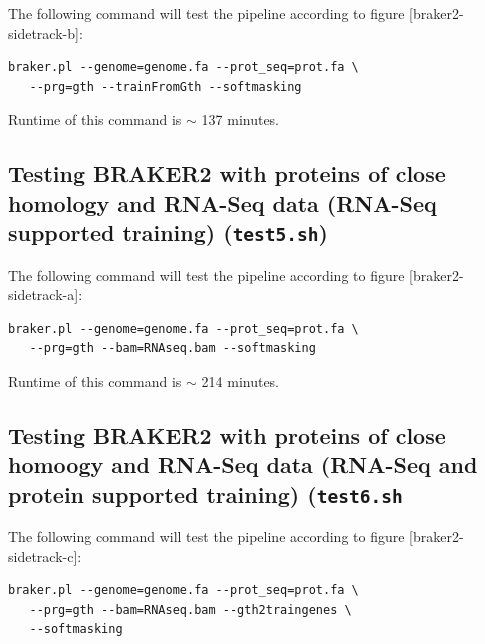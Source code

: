 \documentclass[]{article}
\begin{document}
The following command will test the pipeline according to figure
{[}braker2-sidetrack-b{]}:

\begin{verbatim}
braker.pl --genome=genome.fa --prot_seq=prot.fa \
   --prg=gth --trainFromGth --softmasking
\end{verbatim}

Runtime of this command is \(\sim\) 137 minutes.

\hypertarget{testing-braker2-with-proteins-of-close-homology-and-rna-seq-data-rna-seq-supported-training-test5.sh}{\subsection{\texorpdfstring{Testing
BRAKER2 with proteins of close homology and RNA-Seq data (RNA-Seq
supported training)
(\texttt{test5.sh})}{Testing BRAKER2 with proteins of close homology and RNA-Seq data (RNA-Seq supported training) (test5.sh)}}\label{testing-braker2-with-proteins-of-close-homology-and-rna-seq-data-rna-seq-supported-training-test5.sh}}

The following command will test the pipeline according to figure
{[}braker2-sidetrack-a{]}:

\begin{verbatim}
braker.pl --genome=genome.fa --prot_seq=prot.fa \
   --prg=gth --bam=RNAseq.bam --softmasking
\end{verbatim}

Runtime of this command is \(\sim\) 214 minutes.

\hypertarget{testing-braker2-with-proteins-of-close-homoogy-and-rna-seq-data-rna-seq-and-protein-supported-training-test6.sh}{\subsection{\texorpdfstring{Testing
BRAKER2 with proteins of close homoogy and RNA-Seq data (RNA-Seq and
protein supported training)
(\texttt{test6.sh}}{Testing BRAKER2 with proteins of close homoogy and RNA-Seq data (RNA-Seq and protein supported training) (test6.sh}}\label{testing-braker2-with-proteins-of-close-homoogy-and-rna-seq-data-rna-seq-and-protein-supported-training-test6.sh}}

The following command will test the pipeline according to figure
{[}braker2-sidetrack-c{]}:

\begin{verbatim}
braker.pl --genome=genome.fa --prot_seq=prot.fa \
   --prg=gth --bam=RNAseq.bam --gth2traingenes \
   --softmasking
\end{verbatim}
\end{document}
